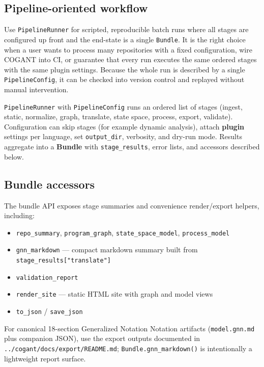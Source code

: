 \documentclass[
]{article}
\providecommand{\tightlist}{%
  \setlength{\itemsep}{0pt}\setlength{\parskip}{0pt}}
\begin{document}
\subsection{Pipeline-oriented
workflow}\label{pipeline-oriented-workflow}

Use \texttt{PipelineRunner} for scripted, reproducible batch runs where
all stages are configured up front and the end-state is a single
\texttt{Bundle}. It is the right choice when a user wants to process
many repositories with a fixed configuration, wire COGANT into CI, or
guarantee that every run executes the same ordered stages with the same
plugin settings. Because the whole run is described by a single
\texttt{PipelineConfig}, it can be checked into version control and
replayed without manual intervention.

\texttt{PipelineRunner} with \texttt{PipelineConfig} runs an ordered
list of stages (ingest, static, normalize, graph, translate, state
space, process, export, validate). Configuration can skip stages (for
example dynamic analysis), attach \textbf{plugin} settings per language,
set \texttt{output\_dir}, verbosity, and dry-run mode. Results aggregate
into a \textbf{Bundle} with \texttt{stage\_results}, error lists, and
accessors described below.

\subsection{Bundle accessors}\label{bundle-accessors}

The bundle API exposes stage summaries and convenience render/export
helpers, including:

\begin{itemize}
\tightlist
\item
  \texttt{repo\_summary}, \texttt{program\_graph},
  \texttt{state\_space\_model}, \texttt{process\_model}
\item
  \texttt{gnn\_markdown} --- compact markdown summary built from
  \texttt{stage\_results{[}"translate"{]}}
\item
  \texttt{validation\_report}
\item
  \texttt{render\_site} --- static HTML site with graph and model views
\item
  \texttt{to\_json} / \texttt{save\_json}
\end{itemize}

For canonical 18-section Generalized Notation Notation artifacts
(\texttt{model.gnn.md} plus companion JSON), use the export outputs
documented in \texttt{../cogant/docs/export/README.md};
\texttt{Bundle.gnn\_markdown()} is intentionally a lightweight report
surface.
\end{document}
